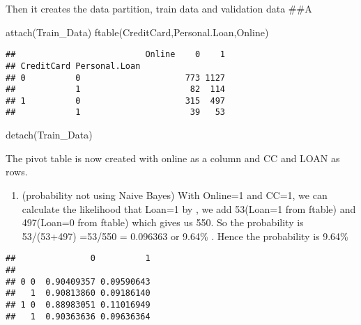 \documentclass[
]{article}
\newenvironment{Shaded}{\begin{snugshade}}{\end{snugshade}}
\newcommand{\AttributeTok}[1]{\textcolor[rgb]{0.77,0.63,0.00}{#1}}
\newcommand{\DecValTok}[1]{\textcolor[rgb]{0.00,0.00,0.81}{#1}}
\newcommand{\FunctionTok}[1]{\textcolor[rgb]{0.00,0.00,0.00}{#1}}
\newcommand{\NormalTok}[1]{#1}
\newcommand{\SpecialCharTok}[1]{\textcolor[rgb]{0.00,0.00,0.00}{#1}}
\providecommand{\tightlist}{%
  \setlength{\itemsep}{0pt}\setlength{\parskip}{0pt}}
\begin{document}
Then it creates the data partition, train data and validation data \#\#A

\begin{Shaded}
\begin{Highlighting}[]
\FunctionTok{attach}\NormalTok{(Train\_Data)}
\FunctionTok{ftable}\NormalTok{(CreditCard,Personal.Loan,Online)}
\end{Highlighting}
\end{Shaded}

\begin{verbatim}
##                          Online    0    1
## CreditCard Personal.Loan                 
## 0          0                     773 1127
##            1                      82  114
## 1          0                     315  497
##            1                      39   53
\end{verbatim}

\begin{Shaded}
\begin{Highlighting}[]
\FunctionTok{detach}\NormalTok{(Train\_Data)}
\end{Highlighting}
\end{Shaded}

The pivot table is now created with online as a column and CC and LOAN
as rows.

\begin{enumerate}
\def\labelenumi{\Alph{enumi})}
\setcounter{enumi}{1}
\tightlist
\item
  (probability not using Naive Bayes) With Online=1 and CC=1, we can
  calculate the likelihood that Loan=1 by , we add 53(Loan=1 from
  ftable) and 497(Loan=0 from ftable) which gives us 550. So the
  probability is 53/(53+497) =53/550 = 0.096363 or 9.64\% . Hence the
  probability is 9.64\%
\end{enumerate}

\begin{Shaded}
\end{Shaded}

\begin{verbatim}
##               0          1
##                           
## 0 0  0.90409357 0.09590643
##   1  0.90813860 0.09186140
## 1 0  0.88983051 0.11016949
##   1  0.90363636 0.09636364
\end{verbatim}
\end{document}
